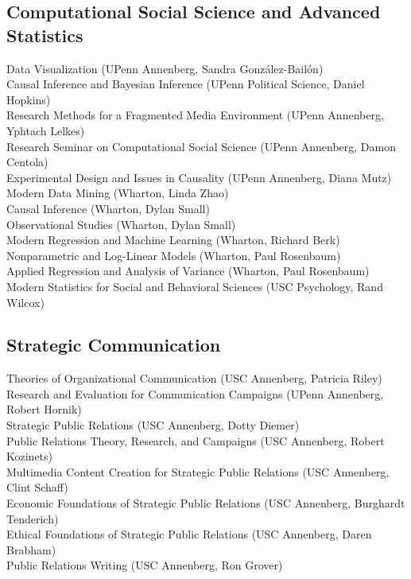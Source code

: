 \documentclass[12pt, letterpaper]{article}
\newcommand{\years}[1]{\marginnote{\normalsize #1}}
\begin{document}
{\subsection*{Computational Social Science and Advanced Statistics}

  \years{} Data Visualization (UPenn Annenberg, Sandra González-Bailón)\\
  \years{} Causal Inference and Bayesian Inference (UPenn Political Science, Daniel Hopkins)\\
  \years{} Research Methods for a Fragmented Media Environment (UPenn Annenberg, Yphtach Lelkes)\\
  \years{} Research Seminar on Computational Social Science (UPenn Annenberg, Damon Centola)\\
  \years{} Experimental Design and Issues in Causality (UPenn Annenberg, Diana Mutz)\\
  \years{} Modern Data Mining (Wharton, Linda Zhao)\\
  \years{} Causal Inference (Wharton, Dylan Small)\\
  \years{} Observational Studies (Wharton, Dylan Small)\\
  \years{} Modern Regression and Machine Learning (Wharton, Richard Berk)\\
  \years{} Nonparametric and Log-Linear Models (Wharton, Paul Rosenbaum)\\
  \years{} Applied Regression and Analysis of Variance (Wharton, Paul Rosenbaum)\\
  \years{} Modern Statistics for Social and Behavioral Sciences (USC Psychology, Rand Wilcox)

\subsection*{Strategic Communication}

  \years{} Theories of Organizational Communication (USC Annenberg, Patricia Riley)\\
  \years{} Research and Evaluation for Communication Campaigns (UPenn Annenberg, Robert Hornik)\\
  \years{} Strategic Public Relations (USC Annenberg, Dotty Diemer)\\
  \years{} Public Relations Theory, Research, and Campaigns (USC Annenberg, Robert Kozinets)\\
  \years{} Multimedia Content Creation for Strategic Public Relations (USC Annenberg, Clint Schaff)\\
  \years{} Economic Foundations of Strategic Public Relations (USC Annenberg, Burghardt Tenderich)\\
  \years{} Ethical Foundations of Strategic Public Relations (USC Annenberg, Daren Brabham)\\
  \years{} Public Relations Writing (USC Annenberg, Ron Grover)

}
\end{document}
